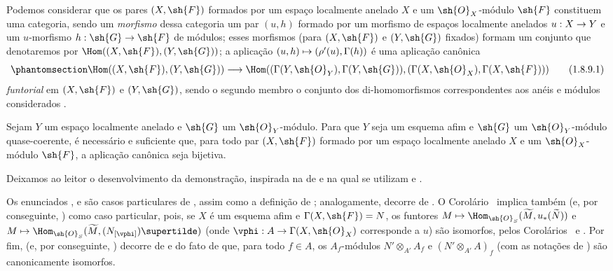 \documentclass[oneside]{amsart}
\makeatletter
\newcommand{\ega@arrow}[2]{\mathchoice{#1}{#2}{#2}{#2}}
\let\ega@shortmapsto\mapsto
\renewcommand{\to}{\ega@arrow{\longrightarrow}{\rightarrow}}
\renewcommand{\mapsto}{\ega@arrow{\longmapsto}{\ega@shortmapsto}}
\newcommand{\oldpage}[2][]{{\marginnote{\normalfont\textbf{#1}~|~#2}}\ignorespaces}
\let\EGAOriginalLabel\label
\renewcommand{\label}[1]{\phantomsection\EGAOriginalLabel{#1}}
\makeatother
\begin{document}
\begin{env}[1.8.9]
\label{I.1.8.9}
Podemos considerar que os pares $(X,\sh{F})$ formados por um espaço
localmente anelado $X$ e um $\sh{O}_X$-módulo $\sh{F}$ constituem uma
categoria, sendo um \emph{morfismo} dessa categoria um par $(u,h)$
formado por um morfismo de espaços localmente anelados
\oldpage[II]{221}
$u:X\to Y$ e um $u$-morfismo $h:\sh{G}\to\sh{F}$ de módulos;
esses morfismos (para $(X,\sh{F})$ e $(Y,\sh{G})$ fixados) formam um
conjunto que denotaremos por $\Hom((X,\sh{F}),(Y,\sh{G}))$;
a aplicação $(u,h)\mapsto(\rho'(u),\Gamma(h))$ é uma aplicação canônica
\[
  \label{I.1.8.9.1}
  \Hom((X,\sh{F}),(Y,\sh{G}))\to\Hom((\Gamma(Y,\sh{O}_Y),\Gamma(Y,\sh{G})),(\Gamma(X,\sh{O}_X),\Gamma(X,\sh{F})))
  \tag{1.8.9.1}
\]
\emph{funtorial} em $(X,\sh{F})$ e $(Y,\sh{G})$, sendo o segundo membro
o conjunto dos di-homomorfismos correspondentes aos anéis e módulos
considerados .
\end{env}

\begin{corollary}[1.8.10]
\label{I.1.8.10}
Sejam $Y$ um espaço localmente anelado e $\sh{G}$ um
$\sh{O}_Y$-módulo. Para que $Y$ seja um esquema afim e $\sh{G}$ um
$\sh{O}_Y$-módulo quase-coerente, é necessário e suficiente que, para
todo par $(X,\sh{F})$ formado por um espaço localmente anelado $X$ e um
$\sh{O}_X$-módulo $\sh{F}$, a aplicação canônica
 seja bijetiva.
\end{corollary}

Deixamos ao leitor o desenvolvimento da demonstração, inspirada na de
 e na qual se utilizam  e
.

\begin{remark}[1.8.11]
\label{I.1.8.11}
Os enunciados ,  e
 são casos particulares de , assim como
a definição de ; analogamente,  decorre
de . O Corolário~ implica também
 (e, por conseguinte, ) como caso
particular, pois, se $X$ é um esquema afim e
$\Gamma(X,\sh{F})=N$, os funtores
$M\mapsto\Hom_{\sh{O}_S}(\widetilde{M},u_*(\widetilde{N}))$ e
$M\mapsto\Hom_{\sh{O}_S}(\widetilde{M},(N_{[\vphi]})\supertilde)$
(onde $\vphi:A\to\Gamma(X,\sh{O}_X)$ corresponde a $u$) são
isomorfos, pelos Corolários~ e .
Por fim,  (e, por conseguinte, ) decorre
de  e do fato de que, para todo $f\in A$, os
$A_f$-módulos $N'\otimes_{A'}A_f$ e $(N'\otimes_{A'}A)_f$ (com as
notações de ) são canonicamente isomorfos.
\end{remark}
\end{document}
